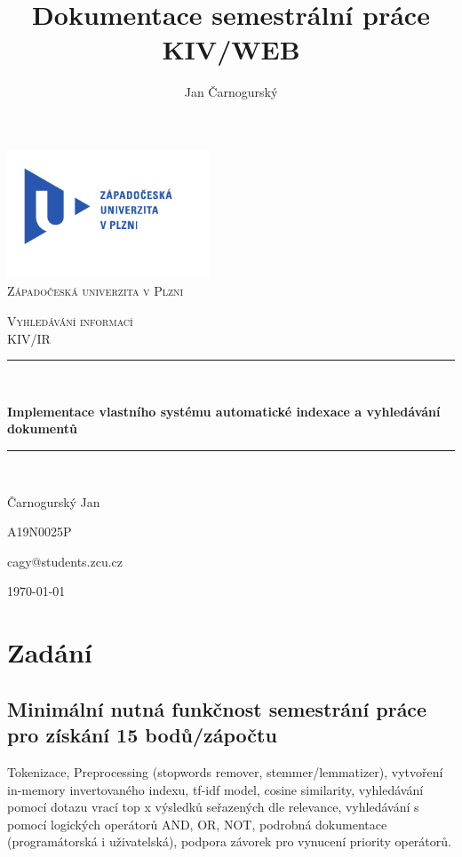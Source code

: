 \documentclass[12pt, a4paper]{article}
\title{\textbf{Dokumentace semestrální práce} \\KIV/WEB}
\author{Jan Čarnogurský}
\begin{document}
\begin{titlepage}
	\newcommand{\HRule}{\rule{\linewidth}{0.3mm}}
	\begin{center}
	\includegraphics[width=6cm]{img/logo}\\
	\textsc{\LARGE Západočeská univerzita v Plzni}\\[1.5cm]
	\end{center}
	\textsc{\Large Vyhledávání informací}\\[0.5cm]
	\textsc{\large KIV/IR}\\[0.5cm]
	\HRule\\[0.2cm]
	\begin{center}
	{\bfseries Implementace vlastního systému automatické indexace a vyhledávání dokumentů}\\[0.5cm]
	\end{center}
	\HRule\\[1.5cm]


	\begin{minipage}{\textwidth}
		\begin{flushleft}
			{\Large Čarnogurský Jan\par}
			{\Large A19N0025P\par}
			{\Large cagy@students.zcu.cz\par}
		\end{flushleft}
	\end{minipage}
	\vfill\vfill\vfill
	\begin{flushright}
	{\large\today}
	\end{flushright}
	\vfill
\end{titlepage}

\tableofcontents
\thispagestyle{empty}
\clearpage

\newpage
\section{Zadání}
\subsection{Minimální nutná funkčnost semestrání práce pro získání 15 bodů/zápočtu}
\noindent Tokenizace, Preprocessing (stopwords remover, stemmer/lemmatizer), vytvoření in-memory invertovaného indexu, tf-idf model, cosine similarity,  vyhledávání pomocí dotazu vrací top x výsledků seřazených dle relevance, vyhledávání s pomocí logických operátorů AND, OR, NOT, podrobná dokumentace (programátorská i uživatelská), podpora závorek pro vynucení priority operátorů.
\end{document}
